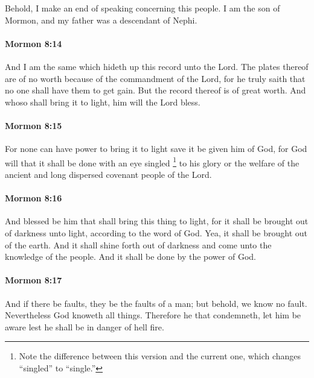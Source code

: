 			Behold, I make an end of speaking concerning this people.
			I am the son of Mormon,
			and my father was a descendant of Nephi.

		\paragraph{Mormon 8:14} %
			\label{MORMON-8-14}

			And I am the same which hideth up this record unto the Lord.
			The plates thereof are of no worth
			because of the commandment of the Lord,
			for he truly saith that no one shall have them to get gain.
			But the record thereof is of great worth.
			And whoso shall bring it to light,
			him will the Lord bless.

		\paragraph{Mormon 8:15} %
			\label{MORMON-8-15}

			For none can have power to bring it to light
			save it be given him of God,
			for God will that it shall be done with an eye singled%
				\footnote{%
					Note the difference between this version and the current one, which changes ``singled'' to ``single.''
					}
			to his glory
			or the welfare of the ancient and long dispersed covenant people of the Lord.

		\paragraph{Mormon 8:16} %
			\label{MORMON-8-16}

			And blessed be him that shall bring this thing to light,
			for it shall be brought out of darkness unto light,
			according to the word of God.
			Yea, it shall be brought out of the earth.
			And it shall shine forth out of darkness
			and come unto the knowledge of the people.
			And it shall be done by the power of God.

		\paragraph{Mormon 8:17} %
			\label{MORMON-8-17}

			And if there be faults,
			they be the faults of a man;
			but behold, we know no fault.
			Nevertheless God knoweth all things.
			Therefore he that condemneth,
			let him be aware lest he shall be in danger of hell fire.


